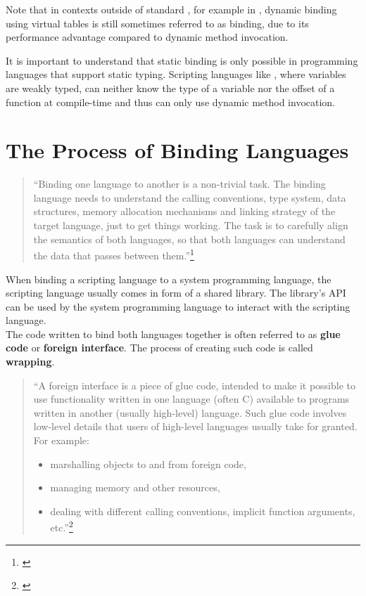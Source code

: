 Note that in contexts outside of standard , for example in , dynamic binding using virtual tables is still sometimes referred to as  binding, due to its performance advantage compared to dynamic method invocation.

It is important to understand that static binding is only possible in programming languages that support static typing. Scripting languages like , where variables are weakly typed, can neither know the type of a variable nor the offset of a function at compile-time and thus can only use dynamic method invocation.

\section{The Process of Binding Languages}

\begin{quotation}
``Binding one language to another is a non-trivial task. The binding language needs to understand the calling conventions, type system, data structures, memory allocation mechanisms and linking strategy of the target language, just to get things working. The task is to carefully align the semantics of both languages, so that both languages can understand the data that passes between them.''\footnote{\citep{RealWorldHaskell}}
\end{quotation}

When binding a scripting language to a system programming language, the scripting language usually comes in form of a shared library. The library's API can be used by the system programming language to interact with the scripting language.\\
The code written to bind both languages together is often referred to as \textbf{glue code} or \textbf{foreign interface}. The process of creating such code is called \textbf{wrapping}.

\begin{quotation}
``A foreign interface is a piece of glue code, intended to make it possible to use functionality written in one language (often C) available to programs written in another (usually high-level) language. Such glue code involves low-level details that users of high-level languages usually take for granted. For example:
\begin{itemize}
\item marshalling objects to and from foreign code,
\item managing memory and other resources,
\item dealing with different calling conventions, implicit function arguments, etc.''\footnote{\citep{FFIScheme}}
\end{itemize}
\end{quotation}

